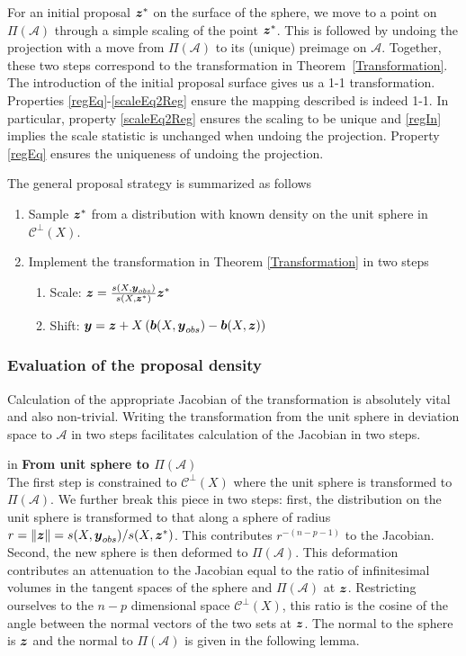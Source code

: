 \documentclass[12pt]{article}
\newcommand{\by}{\mbox{\boldmath $y$}}
\newcommand{\bz}{\mbox{\boldmath $z$}}
\newcommand{\bb}{\mbox{\boldmath $b$}}
\newcommand{\mc}{\mathcal}
\begin{document}
For an initial proposal $\bz^*$ on the surface of the sphere, we move to a point on $\Pi(\mathcal{A})$ through a 
simple scaling of the point $\bz^*$.  This is followed by undoing the projection with a move from 
$\Pi(\mathcal{A})$ to its (unique) preimage on $\mathcal{A}$. Together, these two steps correspond to the
transformation in Theorem~\ref{Transformation}.  The introduction of the initial proposal surface gives us a
1-1 transformation. Properties \ref{regEq}-\ref{scaleEq2Reg} ensure
the mapping described is indeed 1-1. In particular, property
\ref{scaleEq2Reg} ensures the scaling to be unique and \ref{regIn}
implies the scale statistic is unchanged when undoing the
projection. Property \ref{regEq} ensures the uniqueness of undoing the
projection.  
  
The general proposal strategy is summarized as follows
\begin{enumerate}
\item Sample $\bz^*$ from a distribution with known density on the unit sphere in $\mc{C}^\perp(X)$.
\item Implement the transformation in Theorem \ref{Transformation} in two steps
\begin{enumerate}
\item Scale: $\bz=\frac{s(X,\boldsymbol{y}_{obs})}{s(X, \boldsymbol{z}^{*})}\bz^{*}$
\item Shift: $\by=\bz+X\left(\bb(X, \by_{obs})-\bb(X, \bz)\right)$
\end{enumerate}
\end{enumerate}

\subsubsection{Evaluation of the proposal density} 
Calculation of the appropriate Jacobian of the transformation is absolutely vital and also non-trivial. Writing the transformation from the unit sphere in deviation space to $\mathcal{A}$ in 
two steps facilitates calculation 
of the Jacobian in two steps.  

 in
\noindent
{\bf From unit sphere to $\Pi(\mathcal{A})$} \\
The first step is constrained to $\mc{C}^\perp(X)$ where the unit sphere is transformed to $\Pi(\mathcal{A})$. We further break this piece in two steps: first, the distribution on the unit sphere is transformed to that along a sphere of radius $r=\|\bz\|={s(X,\boldsymbol{y}_{obs})}/{s(X, \boldsymbol{z}^{*})}$. This contributes $r^{-(n-p-1)}$ to the Jacobian. Second, the new sphere is then deformed to $\Pi(\mathcal{A})$.  This deformation contributes an attenuation to the Jacobian equal to the
ratio of infinitesimal volumes in the
tangent spaces of the sphere and $\Pi(\mathcal{A})$ at $\bz$.  
Restricting ourselves to the $n-p$ dimensional space $\mc{C}^\perp(X)$, this
ratio is the cosine of the angle between the normal 
vectors of the two sets at $\bz$.  The normal to the sphere is $\bz$ and the normal to
$\Pi(\mathcal{A})$ is given in the following lemma.  
\end{document}
